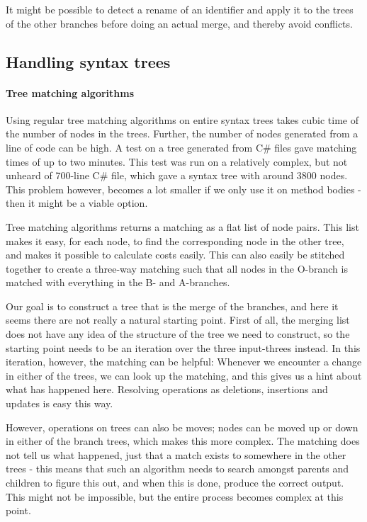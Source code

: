\documentclass[11pt]{article}
\begin{document}
It might be possible to detect a rename of an identifier and apply it to the trees of the other branches before doing an actual merge, and thereby avoid conflicts.

\subsection{Handling syntax trees}
\paragraph{Tree matching algorithms} Using regular tree matching algorithms on entire syntax trees takes cubic time of the number of nodes in the trees. Further, the number of nodes generated from a line of code can be high. A test on a tree generated from C\# files gave matching times of up to two minutes. This test was run on a relatively complex, but not unheard of 700-line C\# file, which gave a syntax tree with around 3800 nodes. This problem however, becomes a lot smaller if we only use it on method bodies - then it might be a viable option.

Tree matching algorithms returns a matching as a flat list of node pairs. This list makes it easy, for each node, to find the corresponding node in the other tree, and makes it possible to calculate costs easily. This can also easily be stitched together to create a three-way matching such that all nodes in the O-branch is matched with everything in the B- and A-branches.

Our goal is to construct a tree that is the merge of the branches, and here it seems there are not really a natural starting point. First of all, the merging list does not have any idea of the structure of the tree we need to construct, so the starting point needs to be an iteration over the three input-threes instead. In this iteration, however, the matching can be helpful: Whenever we encounter a change in either of the trees, we can look up the matching, and this gives us a hint about what has happened here. Resolving operations as deletions, insertions and updates is easy this way.

However, operations on trees can also be moves; nodes can be moved up or down in either of the branch trees, which makes this more complex. The matching does not tell us what happened, just that a match exists to somewhere in the other trees - this means that such an algorithm needs to search amongst parents and children to figure this out, and when this is done, produce the correct output. This might not be impossible, but the entire process becomes complex at this point. 
\end{document}
